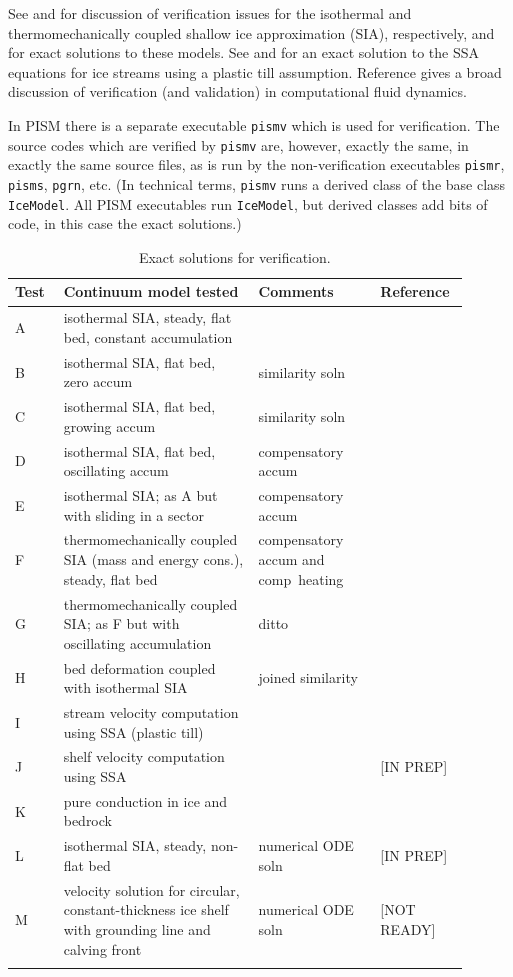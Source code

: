 \documentclass[11pt,final]{amsart}
\begin{document}
See \cite{BLKCB} and \cite{BBL} for discussion of verification issues for the isothermal and thermomechanically coupled shallow ice approximation (SIA), respectively, and for exact solutions to these models.  See \cite{SchoofStream} and \cite{BBssasliding} for an exact solution to the SSA equations for ice streams using a plastic till assumption.  Reference \cite{Roache} gives a broad discussion of verification (and validation) in computational fluid dynamics.

In PISM there is a separate executable \verb|pismv| which is used for verification.  The source codes which are verified by \verb|pismv| are, however, exactly the same, in exactly the same source files, as is run by the non-verification executables \verb|pismr|, \verb|pisms|, \verb|pgrn|, etc.  (In technical terms, \verb|pismv| runs a derived class of the base class \verb|IceModel|.  All PISM executables run \verb|IceModel|, but derived classes add bits of code, in this case the exact solutions.)

\begin{table}[ht]
\caption{Exact solutions for verification.}\label{tab:tests}
\small
\begin{tabular}{p{0.1\linewidth}p{0.4\linewidth}p{0.25\linewidth}p{0.15\linewidth}}\hline
\textbf{Test} & \textbf{Continuum model tested} & \textbf{Comments} & \textbf{Reference} \\ \hline
A & isothermal SIA, steady,  flat bed, constant accumulation &  & \cite{BLKCB} \\
B & isothermal SIA, flat bed, zero accum & similarity soln & \cite{BLKCB,Halfar83} \\
C & isothermal SIA, flat bed, growing accum & similarity soln & \cite{BLKCB} \\
D & isothermal SIA, flat bed, oscillating accum & compensatory accum & \cite{BLKCB} \\
E & isothermal SIA; as A  but with sliding in a sector &  compensatory accum & \cite{BLKCB} \\
F & thermomechanically coupled SIA (mass and energy cons.), steady, flat bed &  compensatory accum and comp~heating& \cite{BB,BBL} \\
G & thermomechanically coupled SIA; as F  but with oscillating accumulation  & ditto & \cite{BB,BBL} \\
H & bed deformation coupled with isothermal SIA & joined similarity & \cite{BLKfastearth} \\
I & stream velocity computation using SSA (plastic till) &  & \cite{SchoofStream,BBssasliding} \\
J & shelf velocity computation using SSA  &  & [IN PREP] \\
K & pure conduction in ice and bedrock & & \cite{BuelerTestK} \\
L & isothermal SIA, steady, non-flat bed & numerical ODE soln & [IN PREP] \\
M & velocity solution for circular, constant-thickness  ice shelf with grounding line and calving front & numerical ODE soln & [NOT READY] \\
\hline
\normalsize
\end{tabular}
\end{table}
\end{document}
